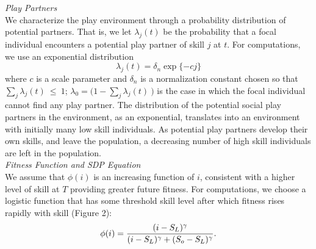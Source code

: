 \documentclass[12pt, letterpaper, fleqn]{article}
\begin{document}
	
	\noindent \textit{Play Partners}\\
	We characterize the play environment through a probability distribution of potential partners. 
	That is, we let $\lambda_j(t)$ be the probability that a focal individual encounters a potential play partner of skill $j$ at $t$.
	For computations, we use an exponential distribution         
	\begin{equation}
	\lambda_j(t) = \delta_n \exp\{-cj\}
	\label{lambda_j}
	\end{equation}
	where $c$ is a scale parameter and $\delta_n$ is a normalization constant chosen so that $\sum_j \lambda_j(t)~\le~1$; $\lambda_0=\big(1-\sum_j \lambda_j(t)~\big)$ is the case in which the focal individual cannot find any play partner. %
	The distribution of the potential social play partners in the environment, as an exponential, translates into an environment with initially many low skill individuals.
	As potential play partners develop their own skills, and leave the population, a decreasing number of high skill individuals are left in the population. \\%
	
	
	\noindent \textit{Fitness Function and SDP Equation}\\
	We assume that $\phi(i)$ is an increasing function of $i$, consistent with a higher level of skill at $T$ providing greater future fitness.
	For computations, we choose a logistic function that has some threshold skill level after which fitness rises rapidly with skill (Figure 2):
	\begin{equation}
	\phi(i) = {(i-S_L)^\gamma \over {(i-S_L)^\gamma+(S_o-S_L)^\gamma} }.
	\label{phi}
	\end{equation}
	
\end{document}
